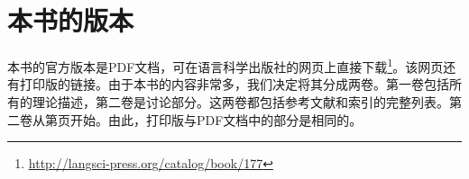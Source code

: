 
\section*{本书的版本}

本书的官方版本是PDF文档，可在语言科学出版社的网页上直接下载\footnote{%
\url{http://langsci-press.org/catalog/book/177}
}。该网页还有打印版的链接。由于本书的内容非常多，我们决定将其分成两卷。第一卷包括所有的理论描述，第二卷是讨论部分。这两卷都包括参考文献和索引的完整列表。第二卷从第\pageref{part-discussion}页开始。由此，打印版与PDF文档中的部分是相同的。







